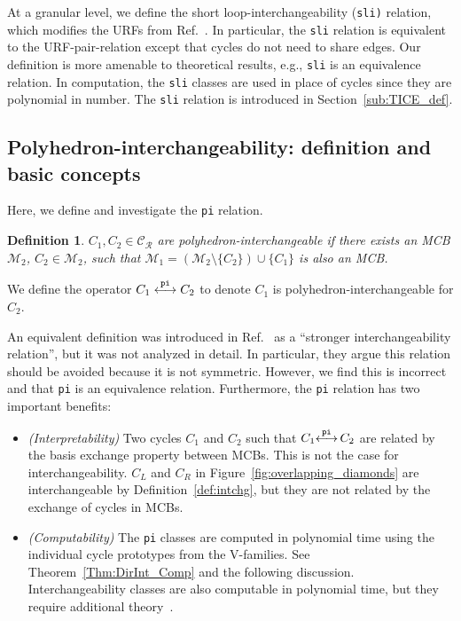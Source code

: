 \documentclass[fleqn,11pt]{article}
\newtheorem{definition}{Definition}
\newcommand\calM{\mathcal{M}}
\newcommand\RelCyc{\mathcal{C_R}} %
\newcommand\pInt{ \stackrel{\tt pi}{\longleftrightarrow} }
\begin{document}
At a granular level, we define the short loop-interchangeability {(\tt sli)} relation, which modifies the URFs from Ref.~\cite{kolodzikUnique2012}. In particular, the {\tt sli} relation is equivalent to the URF-pair-relation except that cycles do not need to share edges. Our definition is more amenable to theoretical results, e.g., {\tt sli} is an equivalence relation. In computation, the {\tt sli} classes are used in place of cycles since they are polynomial in number. The {\tt sli} relation is introduced in Section~\ref{sub:TICE_def}.

\subsection{Polyhedron-interchangeability: definition and basic concepts}
\label{sub:DICE_Def}

Here, we define and investigate the {\tt pi} relation. %
\begin{definition}
	$C_1,C_2\in\RelCyc$ are \emph{polyhedron-interchangeable} if there exists an MCB $\calM_2$, $C_2\in\calM_2$, such that $\calM_1=(\calM_2\setminus\{C_2\})\cup\{C_1\}$ is also an MCB.
	\label{def:dir_intchg}
\end{definition}
\noindent We define the operator $C_1\pInt C_2$ to denote $C_1$ is polyhedron-interchangeable for $C_2$.

An equivalent definition was introduced in Ref.~\cite{gleissInterchangeability2000} as a ``stronger interchangeability relation'', but it was not analyzed in detail. In particular, they argue this relation should be avoided because it is not symmetric. However, we find this is incorrect and that {\tt pi} is an equivalence relation. Furthermore, the {\tt pi} relation has two important benefits:
\begin{itemize}
	\item \emph{(Interpretability)} Two cycles $C_1$ and $C_2$ such that $C_1{\pInt}\, C_2$ are related by the basis exchange property between MCBs. %
	This is not the case for interchangeability.
	$C_L$ and $C_R$ in Figure~\ref{fig:overlapping_diamonds} are interchangeable by Definition~\ref{def:intchg}, but they are not related by the exchange of cycles in MCBs.
	\item \emph{(Computability)} The {\tt pi} classes are computed in polynomial time using the individual cycle prototypes from the V-families. See Theorem~\ref{Thm:DirInt_Comp} and the following discussion. Interchangeability classes are also computable in polynomial time, but they require additional theory~\cite{bergerComputing2017}.
\end{itemize}
\end{document}
